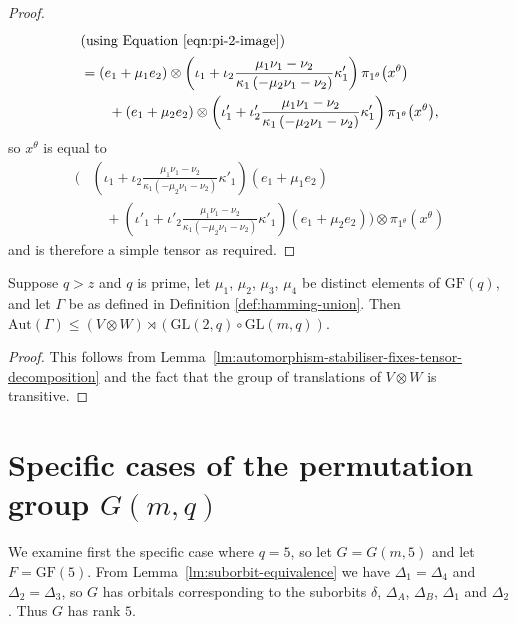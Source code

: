 \documentclass[ALCO, Unicode]{cedram}
\newcommand{\Aut}{\mathrm{Aut}}
\newcommand{\GF}{\mathrm{GF}}
\newcommand{\GL}{\mathrm{GL}}
\begin{document}
\begin{proof}
\begin{align*}
    \intertext{(using Equation \eqref{eqn:pi-2-image}) }
    &= \left(e_1 + \mu_1 e_2 \right) \otimes \left(\iota_1 + \iota_2 \frac{\mu_1 \nu_1 - \nu_2}{\kappa_1 \left(-\mu_2 \nu_1 - \nu_2 \right)} \kappa'_1 \right) \pi_{1^\theta}{\left(x^\theta \right)} \\
    &\ \ \ \ \ \ + \left(e_1 + \mu_2 e_2 \right) \otimes \left(\iota'_1 + \iota'_2 \frac{\mu_1 \nu_1 - \nu_2}{\kappa_1 \left(-\mu_2 \nu_1 - \nu_2 \right)} \kappa'_1 \right) \pi_{1^\theta}{\left(x^\theta \right)},
\end{align*}
so $x^\theta$ is equal to
\begin{align*}
    \Bigg(&\left(\iota_1 + \iota_2 \frac{\mu_1 \nu_1 - \nu_2}{\kappa_1 \left(-\mu_2 \nu_1 - \nu_2 \right)} \kappa'_1 \right) \left(e_1 + \mu_1 e_2 \right)  \\
    &\quad + \left(\iota'_1 + \iota'_2 \frac{\mu_1 \nu_1 - \nu_2}{\kappa_1 \left(-\mu_2 \nu_1 - \nu_2 \right)} \kappa'_1 \right) \left(e_1 + \mu_2 e_2 \right)\Bigg) \otimes \pi_{1^\theta}{\left(x^\theta \right)}
\end{align*}
and is therefore a simple tensor as required.
\end{proof}

\begin{prop} \label{prop:automorphism-group-affine-decomp}
Suppose $q > z$ and $q$ is prime, let $\mu_1$, $\mu_2$, $\mu_3$, $\mu_4$ be distinct elements of $\GF{\left(q \right)}$, and let $\Gamma$ be as defined in Definition \ref{def:hamming-union}. Then $\Aut{\left(\Gamma \right)} \leqslant \left(V \otimes W \right) \rtimes \left(\GL{\left(2, q \right)} \circ \GL{\left(m, q \right)}\right)$.
\end{prop}
\begin{proof}
This follows from Lemma~\ref{lm:automorphism-stabiliser-fixes-tensor-decomposition} and the fact that the group of translations of $V \otimes W$ is transitive.
\end{proof}

\section{Specific cases of the permutation group \texorpdfstring{$G{\left(m, q \right)}$}{G(m,q)}} \label{sc:specific-values}

We examine first the specific case where $q = 5$, so let $G = G{\left(m, 5 \right)}$ and let $F = \GF{\left(5 \right)}$.
From Lemma~\ref{lm:suborbit-equivalence} we have $\Delta_1 = \Delta_4$ and $\Delta_2 = \Delta_3$, so $G$ has orbitals corresponding to the suborbits $\delta$, $\Delta_A$, $\Delta_B$, $\Delta_1$ and $\Delta_2$. Thus $G$ has rank $5$.
\end{document}
